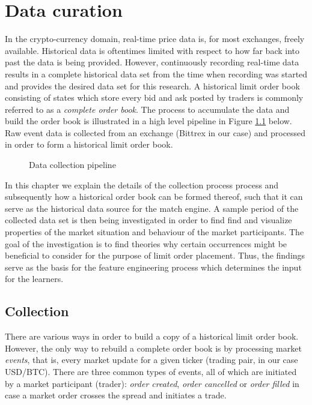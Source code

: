 \chapter{Data curation}
\label{chap:data}

In the crypto-currency domain, real-time price data is, for most exchanges, freely available. Historical data is oftentimes limited with respect to how far back into past the data is being provided. However, continuously recording real-time data results in a complete historical data set from the time when recording was started and provides the desired data set for this research.
A historical limit order book consisting of states which store every bid and ask posted by traders is commonly referred to as a \textit{complete order book}.
The process to accumulate the data and build the order book is illustrated in a high level pipeline in Figure \ref{fig:data-pipeline} below.
Raw event data is collected from an exchange (Bittrex in our case) and processed in order to form a historical limit order book.
\begin{figure}[H]
    \centering
    \caption{Data collection pipeline}
    \label{fig:data-pipeline}
\end{figure}

In this chapter we explain the details of the collection process process and subsequently how a historical order book can be formed thereof, such that it can serve as the historical data source for the match engine.
A sample period of the collected data set is then being investigated in order to find find and visualize properties of the market situation and behaviour of the market participants.
The goal of the investigation is to find theories why certain occurrences might be beneficial to consider for the purpose of limit order placement.
Thus, the findings serve as the basis for the feature engineering process which determines the input for the learners.

\section{Collection}

There are various ways in order to build a copy of a historical limit order book. However, the only way to rebuild a complete order book is by processing market \textit{events}, that is, every market update for a given ticker (trading pair, in our case USD/BTC).
There are three common types of events, all of which are initiated by a market participant (trader): \textit{order created}, \textit{order cancelled} or \textit{order filled} in case a market order crosses the spread and initiates a trade.

